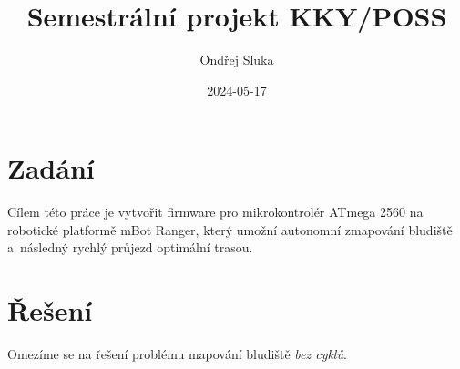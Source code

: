 \documentclass[a4paper,11pt]{article}
\author{Ondřej Sluka}
\date{2024-05-17}
\title{Semestrální projekt KKY/POSS}
\begin{document}
\maketitle
\tableofcontents

\section{Zadání}
Cílem této práce je vytvořit firmware pro mikrokontrolér ATmega 2560 na
robotické platformě mBot Ranger, který umožní autonomní zmapování bludiště
a~následný rychlý průjezd optimální trasou.

\section{Řešení}
Omezíme se na řešení problému mapování bludiště \emph{bez cyklů}.
\end{document}
